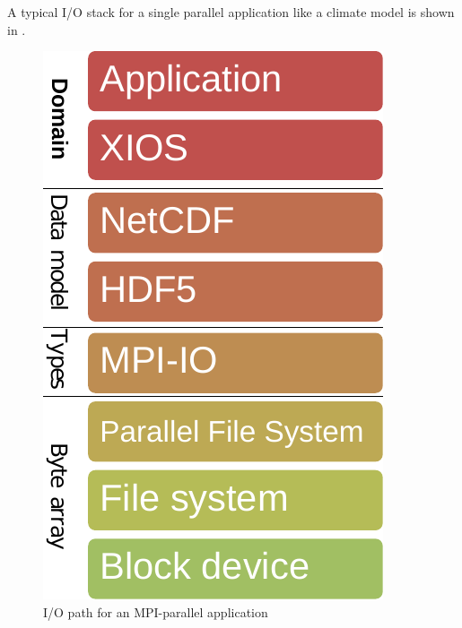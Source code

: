 \documentclass[a4paper]{article}
\begin{document}
A typical I/O stack for a single parallel application like a climate model is shown in .

\begin{minipage}{0.2\textwidth}
\begin{figure}[H]
  \includegraphics[width=\textwidth]{layers-xios}
  \caption{I/O path for an MPI-parallel application}
  \label{fig:layers}
\end{figure}
\end{minipage}
\qquad
\end{document}
